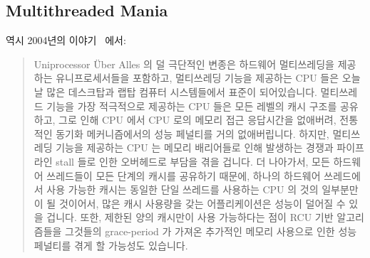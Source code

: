 \subsection{Multithreaded Mania}
\label{sec:future:Multithreaded Mania}

역시 2004년의 이야기~\cite{PaulEdwardMcKenneyPhD} 에서:

\begin{quote}
	Uniprocessor \"Uber Alles 의 덜 극단적인 변종은 하드웨어 멀티쓰레딩을
	제공하는 유니프로세서들을 포함하고, 멀티쓰레딩 기능을 제공하는 CPU 들은
	오늘날 많은 데스크탑과 랩탑 컴퓨터 시스템들에서 표준이 되어있습니다.
	멀티쓰레드 기능을 가장 적극적으로 제공하는 CPU 들은 모든 레벨의 캐시
	구조를 공유하고, 그로 인해 CPU 에서 CPU 로의 메모리 접근 응답시간을
	없애버려, 전통적인 동기화 메커니즘에서의 성능 페널티를 거의
	없애버립니다.
	하지만, 멀티쓰레딩 기능을 제공하는 CPU 는 메모리 배리어들로 인해
	발생하는 경쟁과 파이프라인 stall 들로 인한 오버헤드로 부담을 겪을
	겁니다.
	더 나아가서, 모든 하드웨어 쓰레드들이 모든 단계의 캐시를 공유하기
	때문에, 하나의 하드웨어 쓰레드에서 사용 가능한 캐시는 동일한 단일
	쓰레드를 사용하는 CPU 의 것의 일부분만이 될 것이어서, 많은 캐시
	사용량을 갖는 어플리케이션은 성능이 덜어질 수 있을 겁니다.
	또한, 제한된 양의 캐시만이 사용 가능하다는 점이 RCU 기반 알고리즘들을
	그것들의 grace-period 가 가져온 추가적인 메모리 사용으로 인한 성능
	페널티를 겪게 할 가능성도 있습니다.

\end{quote}
